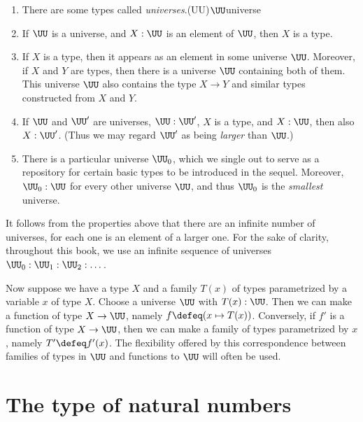 \begin{enumerate}
  \item There are some types called \emph{universes}.\glossary(UU){$\protect\UU$}{universe}
  \item If $\UU$ is a universe, and $X : \UU$ is an element of $\UU$, then $X$ is a type.
  \item If $X$ is a type, then it appears as an element in some 
  universe $\UU$. Moreover, if $X$ and $Y$ are types, 
  then there is a universe $\UU$ containing both of them.
  This universe $\UU$ also contains the type $X\to Y$ and similar
  types constructed from $X$ and $Y$.
  \item\label{it:cumulative} If $\UU$ and $\UU'$ are universes,
  $\UU:\UU'$, $X$ is a type, and $X:\UU$, then also $X:\UU'$.
  (Thus we may regard $\UU'$ as being \emph{larger} than $\UU$.)
  \item There is a particular universe $\UU_0$, which we single out to serve
  as a repository for certain basic types to be introduced in the sequel.
  Moreover, $\UU_0 : \UU$ for every other universe $\UU$, 
  and thus $\UU_0$ is the \emph{smallest} universe.
\end{enumerate}

It follows from the properties above that there are an infinite number of
 universes, for each one is an element of a larger one. For the sake of
 clarity, throughout this book, we use an infinite sequence of universes
 $\UU_0 : \UU_1 : \UU_2 : \dots$.

Now suppose we have a type $X$ and a family $T(x)$ of types parametrized by a variable $x$ of type $X$.  Choose a universe $\UU$ with $T(x) : \UU$.
Then we can make a function of type $X \to \UU$, namely $f \defeq (x \mapsto T(x))$.  Conversely, if $f'$ is a function of type $X \to \UU$, then
we can make a family of types parametrized by $x$, namely $T' \defeq f'(x)$.  The flexibility offered by this correspondence between families of
types in $\UU$ and functions to $\UU$ will often be used.

\section{The type of natural numbers}
\label{sec:natural-numbers}

